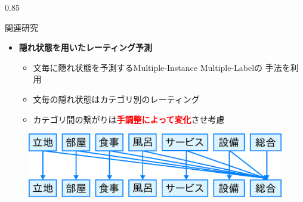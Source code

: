 \documentclass[unicode,10pt]{beamer}
\newlength{\mycolumnwidth}
\newcommand{\itemtitle}[1]{\textbf{#1}\\}
\newcommand{\fire}[1]{\textcolor{red}{\textbf{#1}}}
\begin{document}
\begin{frame}[t]
\begin{columns}[onlytextwidth,t]
\begin{column}{0.85\mycolumnwidth}
  \begin{block}{関連研究}
    \begin{itemize}
      \item \itemtitle{隠れ状態を用いたレーティング予測\cite{fujitani15}}
        \begin{itemize}
          \item 文毎に隠れ状態を予測するMultiple-Instance Multiple-Labelの
                手法を利用
          \item 文毎の隠れ状態はカテゴリ別のレーティング
          \item カテゴリ間の繋がりは\fire{手調整によって変化}させ考慮
        \end{itemize}
    \end{itemize}

    \begin{figure}
      \includegraphics[width=0.7\linewidth]
          {fig/fujitani_miml_relations_among_rating_categories.pdf}
    \end{figure}


\end{block}
\end{column}
\end{columns}
\end{frame}
\end{document}

